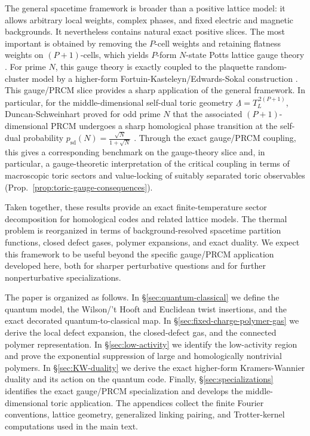\documentclass[dvipsnames,a4paper]{article}
\numberwithin{equation}{section}
\theoremstyle{definition}
\theoremstyle{remark}
\begin{document}
The general spacetime framework is broader than a positive lattice model: it
allows arbitrary local weights, complex phases, and fixed electric and magnetic
backgrounds. It nevertheless contains natural exact positive slices. The most
important is obtained by removing the \(P\)-cell weights and retaining flatness
weights on \((P+1)\)-cells, which yields \(P\)-form \(N\)-state Potts lattice
gauge theory \cite{Wegner:1971app,FradkinShenker1979,BanksRabinovici1979}. For
prime \(N\), this gauge theory is exactly coupled to the plaquette random-cluster
model by a higher-form Fortuin-Kasteleyn/Edwards-Sokal construction
\cite{FortuinKasteleyn1972,EdwardsSokal1988,HiraokaShirai2016,
	DuncanSchweinhartTopological,DuncanSchweinhartDeconfinement}. This
gauge/PRCM slice provides a sharp application of the general framework. In
particular, for the middle-dimensional self-dual toric geometry
\(\underline\Lambda=T_L^{\,2(P+1)}\), Duncan-Schweinhart proved for odd prime
\(N\) that the associated \((P+1)\)-dimensional PRCM undergoes a sharp
homological phase transition at the self-dual probability
\(p_{\mathrm{sd}}(N)=\frac{\sqrt N}{1+\sqrt N}\)
\cite{DuncanSchweinhartTopological}. Through the exact gauge/PRCM coupling, this
gives a corresponding benchmark on the gauge-theory slice and, in particular, a
gauge-theoretic interpretation of the critical coupling in terms of macroscopic
toric sectors and value-locking of suitably separated toric observables
(Prop.~\ref{prop:toric-gauge-consequences}).

Taken together, these results provide an exact finite-temperature sector
decomposition for homological codes and related lattice models. The thermal
problem is reorganized in terms of background-resolved spacetime partition functions,
closed defect gases, polymer expansions, and exact duality. We expect this
framework to be useful beyond the specific gauge/PRCM application developed
here, both for sharper perturbative questions and for further nonperturbative
specializations.

The paper is organized as follows. In \S\ref{sec:quantum-classical} we define
the quantum model, the Wilson/'t Hooft and Euclidean twist insertions, and the
exact decorated quantum-to-classical map. In
\S\ref{sec:fixed-charge-polymer-gas} we derive the local defect expansion, the
closed-defect gas, and the connected polymer representation. In
\S\ref{sec:low-activity} we identify the low-activity region and prove the
exponential suppression of large and homologically nontrivial polymers. In
\S\ref{sec:KW-duality} we derive the exact higher-form Kramers-Wannier duality
and its action on the quantum code. Finally, \S\ref{sec:specializations}
identifies the exact gauge/PRCM specialization and develops the
middle-dimensional toric application. The appendices collect the finite Fourier
conventions, lattice geometry, generalized linking pairing, and Trotter-kernel
computations used in the main text.
\end{document}
